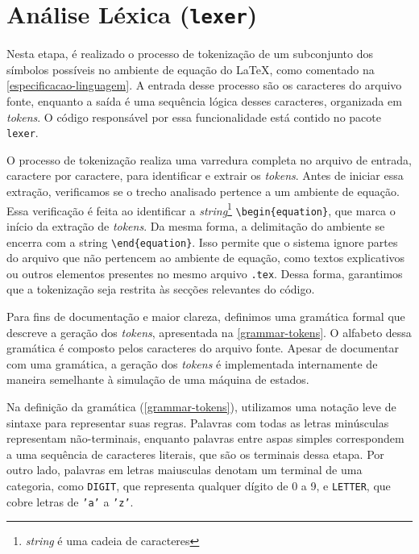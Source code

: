 \section{Análise Léxica (\texttt{lexer})} \label{section-lexer}

Nesta etapa, é realizado o processo de tokenização de um subconjunto dos símbolos possíveis no ambiente de equação do \LaTeX{}, como comentado na \autoref{especificacao-linguagem}. A entrada desse processo são os caracteres do arquivo fonte, enquanto a saída é uma sequência lógica desses caracteres, organizada em \textit{tokens}. O código responsável por essa funcionalidade está contido no pacote \texttt{lexer}.

O processo de tokenização realiza uma varredura completa no arquivo de entrada, caractere por caractere, para identificar e extrair os \textit{tokens}. Antes de iniciar essa extração, verificamos se o trecho analisado pertence a um ambiente de equação. Essa verificação é feita ao identificar a \textit{string}\footnote{\textit{string} é uma cadeia de caracteres} \verb|\begin{equation}|, que marca o início da extração de \textit{tokens}. Da mesma forma, a delimitação do ambiente se encerra com a string \verb|\end{equation}|. Isso permite que o sistema ignore partes do arquivo que não pertencem ao ambiente de equação, como textos explicativos ou outros elementos presentes no mesmo arquivo \texttt{.tex}. Dessa forma, garantimos que a tokenização seja restrita às secções relevantes do código.

Para fins de documentação e maior clareza, definimos uma gramática formal que descreve a geração dos \textit{tokens}, apresentada na \autoref{grammar-tokens}. O alfabeto dessa gramática é composto pelos caracteres do arquivo fonte. Apesar de documentar com uma gramática, a geração dos \textit{tokens} é implementada internamente de maneira semelhante à simulação de uma máquina de estados.

Na definição da gramática (\autoref{grammar-tokens}), utilizamos uma notação leve de sintaxe para representar suas regras. Palavras com todas as letras minúsculas representam não-terminais, enquanto palavras entre aspas simples correspondem a uma sequência de caracteres literais, que são os terminais dessa etapa. Por outro lado, palavras em letras maiusculas denotam um terminal de uma categoria, como \texttt{DIGIT}, que representa qualquer dígito de 0 a 9, e \texttt{LETTER}, que cobre letras de \texttt{'a'} a \texttt{'z'}.

